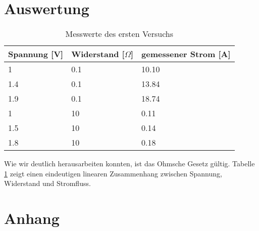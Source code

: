 \documentclass[a4paper,12pt]{article}
\begin{document}
\section{Auswertung}

\begin{table} 
  \begin{tabular}{l|l|l}    
    Spannung [V]  & Widerstand [$\Omega$] & gemessener Strom [A] \\ \hline
    1 & 0.1 & 10.10 \\
    1.4 & 0.1 & 13.84 \\
    1.9 & 0.1 & 18.74 \\ 
    1 & 10 & 0.11 \\
    1.5 & 10 & 0.14 \\
    1.8 & 10 & 0.18 \\ 
  \end{tabular}
  
 \caption{Messwerte des ersten Versuchs}
 \label{table:messwerte}
\end{table}

Wie wir deutlich herausarbeiten konnten, ist das Ohmsche Gesetz gültig. Tabelle \ref{table:messwerte} zeigt einen eindeutigen linearen Zusammenhang zwischen Spannung, Widerstand und Stromfluss. 

\section{Anhang}

\listoftables
\end{document}
